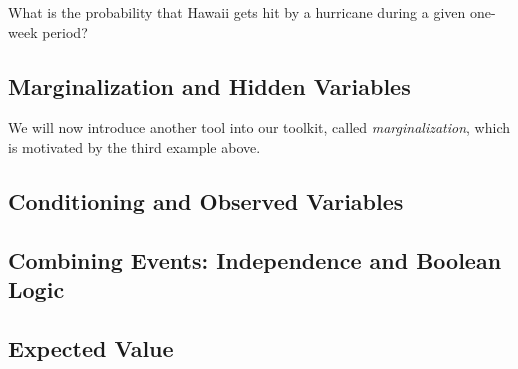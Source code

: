 \documentclass[11pt]{article}
\newenvironment{example}[1][Example]{\begin{trivlist}
\item[\hskip \labelsep {\bfseries #1}]}{\end{trivlist}}
\begin{document}
\begin{example}
What is the probability that Hawaii gets hit by a hurricane during a given one-week period?


\end{example}

\subsection{Marginalization and Hidden Variables}

We will now introduce another tool into our toolkit, called \emph{marginalization}, which is motivated by the third example above.

\subsection{Conditioning and Observed Variables}
\subsection{Combining Events: Independence and Boolean Logic}
\subsection{Expected Value}
\end{document}
